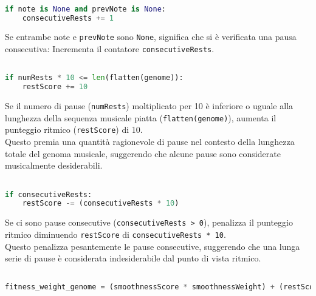 \documentclass[a4paper,12pt]{report}
\begin{document}
\begin{lstlisting}[language=Python]

if note is None and prevNote is None:
    consecutiveRests += 1

\end{lstlisting}

Se entrambe note e \texttt{prevNote} sono \texttt{None}, significa che si è verificata una pausa consecutiva: Incrementa il contatore \texttt{consecutiveRests}.

\begin{lstlisting}[language=Python]

if numRests * 10 <= len(flatten(genome)):
    restScore += 10

\end{lstlisting}

Se il numero di pause (\texttt{numRests}) moltiplicato per 10 è inferiore o uguale alla lunghezza della sequenza musicale piatta (\texttt{flatten(genome)}), aumenta il punteggio ritmico (\texttt{restScore}) di 10. \\
Questo premia una quantità ragionevole di pause nel contesto della lunghezza totale del genoma musicale, suggerendo che alcune pause sono considerate musicalmente desiderabili.

\begin{lstlisting}[language=Python]

if consecutiveRests:
    restScore -= (consecutiveRests * 10)

\end{lstlisting}

Se ci sono pause consecutive (\texttt{consecutiveRests > 0}), penalizza il punteggio ritmico diminuendo \texttt{restScore} di \texttt{consecutiveRests * 10}. \\
Questo penalizza pesantemente le pause consecutive, suggerendo che una lunga serie di pause è considerata indesiderabile dal punto di vista ritmico.

\begin{lstlisting}[language=Python]

fitness_weight_genome = (smoothnessScore * smoothnessWeight) + (restScore * restWeight) + (harmonyScore * harmonyWeight)

\end{lstlisting}
\end{document}
